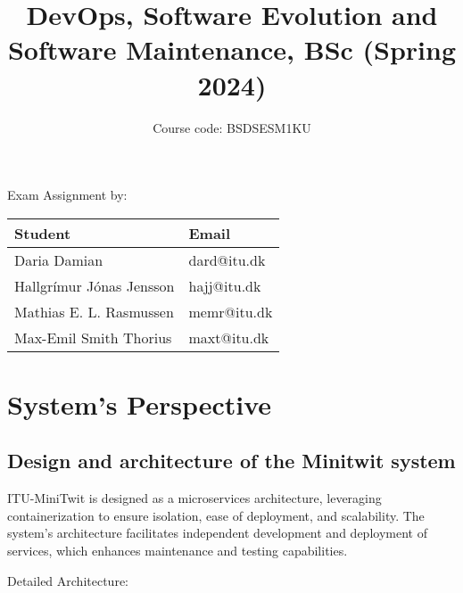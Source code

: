 \documentclass[12pt, a4paper, oneside]{book}
\title{DevOps, Software Evolution and Software Maintenance, BSc (Spring 2024)}
\author{Course code: BSDSESM1KU}
\begin{document}
\begin{minipage}{\textwidth}
\maketitle

\begin{center}
    Exam Assignment by: \\
    \hfill \break
    \bgroup
    \def\arraystretch{1.5}%
    \begin{tabularx}{0.8\textwidth} { 
      | >{\centering\arraybackslash}X 
      | >{\centering\arraybackslash}X | }
     \hline
     \cellcolor[HTML]{EFEFEF} Student & \cellcolor[HTML]{EFEFEF} Email \\
     \hline
     Daria Damian & dard@itu.dk \\
     \hline
     Hallgrímur Jónas Jensson & hajj@itu.dk \\
    \hline
     Mathias E. L. Rasmussen & memr@itu.dk \\
    \hline
     Max-Emil Smith Thorius & maxt@itu.dk \\
    \hline
    \end{tabularx}
    \egroup
\end{center}
\end{minipage}

\tableofcontents

\chapter{System's Perspective}

\section{Design and architecture of the Minitwit system}


ITU-MiniTwit is designed as a microservices architecture, leveraging containerization to ensure isolation, ease of deployment, and scalability. The system's architecture facilitates independent development and deployment of services, which enhances maintenance and testing capabilities.

Detailed Architecture:
\end{document}
